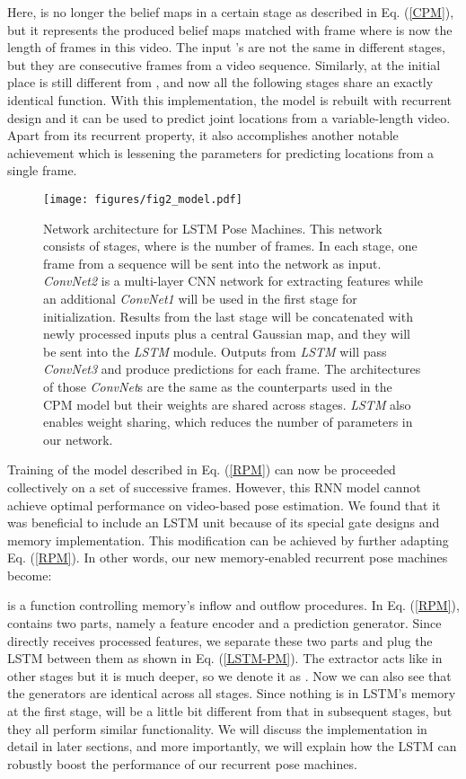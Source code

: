 \documentclass[10pt,twocolumn,letterpaper]{article}
\begin{document}
Here,  is no longer the belief maps in a certain stage as described in Eq. (\ref{CPM}), but it represents the produced belief maps matched with frame  where  is now the length of frames in this video. The input 's are not the same in different stages, but they are consecutive frames from a video sequence. Similarly,  at the initial place is still different from , and now all the following stages share an exactly identical function. With this implementation, the model is rebuilt with recurrent design and it can be used to predict joint locations from a variable-length video. Apart from its recurrent property, it also accomplishes another notable achievement which is lessening the parameters for predicting locations from a single frame.

\begin{figure*}
  \center
  \texttt{[image: figures/fig2\_model.pdf]}
  \caption{Network architecture for LSTM Pose Machines. This network consists of  stages, where  is the number of frames. In each stage, one frame from a sequence will be sent into the network as input. \textit{ConvNet2} is a multi-layer CNN network for extracting features while an additional \textit{ConvNet1} will be used in the first stage for initialization. Results from the last stage will be concatenated with newly processed inputs plus a central Gaussian map, and they will be sent into the \textit{LSTM} module. Outputs from \textit{LSTM} will pass \textit{ConvNet3} and produce predictions for each frame. The architectures of those \textit{ConvNet}s are the same as the counterparts used in the CPM model \cite{wei16refineCPM} but their weights are shared across stages. \textit{LSTM} also enables weight sharing, which reduces the number of parameters in our network.}
  \label{Model}
  \vspace{-10pt}
\end{figure*}

Training of the model described in Eq. (\ref{RPM}) can now be proceeded collectively on a set of successive frames. However, this RNN model cannot achieve optimal performance on video-based pose estimation. We found that it was beneficial to include an LSTM unit \cite{hoch97LSTM} because of its special gate designs and memory implementation. This modification can be achieved by further adapting Eq. (\ref{RPM}). In other words, our new memory-enabled recurrent pose machines become:

 is a function controlling memory's inflow and outflow procedures. In Eq. (\ref{RPM}),  contains two parts, namely a feature encoder and a prediction generator. Since  directly receives processed features, we separate these two parts and plug the LSTM between them as shown in Eq. (\ref{LSTM-PM}). The extractor acts like  in other stages but it is much deeper, so we denote it as .  Now we can also see that the generators  are identical across all stages. Since nothing is in LSTM's memory at the first stage,  will be a little bit different from that in subsequent stages, but they all perform similar functionality. We will discuss the implementation in detail in later sections, and more importantly, we will explain how the LSTM can robustly boost the performance of our recurrent pose machines. 
\end{document}
